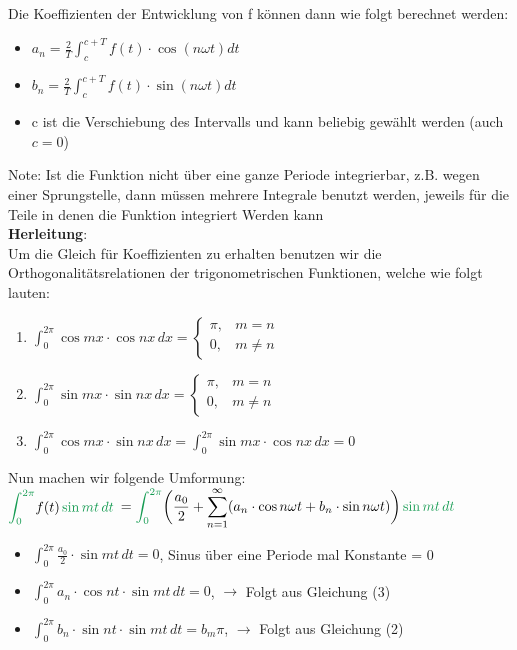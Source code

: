 \documentclass[12pt,a4paper]{article}
\newcommand{\green}[1]{\textcolor{ForestGreen} {#1}}
\newcommand{\nl}{\\[0.1cm]}
\begin{document}
Die Koeffizienten der Entwicklung von f können dann wie folgt berechnet werden:\nl
\begin{itemize}
\item $\displaystyle a_n = \frac{2}{T} \int_c^{c+T} f(t)\cdot \cos(n\omega t)dt$
\item $\displaystyle b_n = \frac{2}{T} \int_c^{c+T} f(t)\cdot \sin(n\omega t)dt$
\item c ist die Verschiebung des Intervalls und kann beliebig gewählt werden (auch $c=0$)
\end{itemize}
Note: Ist die Funktion nicht über eine ganze Periode integrierbar, z.B. wegen einer Sprungstelle, dann müssen mehrere Integrale benutzt werden, jeweils für die Teile in denen die Funktion integriert Werden kann\\
\textbf{Herleitung}:\nl
Um die Gleich für Koeffizienten zu erhalten benutzen wir die Orthogonalitätsrelationen der trigonometrischen Funktionen, welche wie folgt lauten:
\begin{enumerate}
\item $\displaystyle \int_0^{2\pi} \cos mx \cdot \cos nx \,dx = \begin{cases}\pi ,& m=n\\0 ,& m\neq n\end{cases}$
\item $\displaystyle \int_0^{2\pi} \sin mx \cdot \sin nx \,dx = \begin{cases}\pi ,& m=n\\0 ,& m\neq n\end{cases}$
\item $\displaystyle \int_0^{2\pi} \cos mx \cdot \sin nx \,dx = \int_0^{2\pi} \sin mx \cdot \cos nx \,dx = 0$
\end{enumerate}
Nun machen wir folgende Umformung:\nl
$\displaystyle \green{\int_0^{2\pi}} f(t)\, \green{\sin mt \, dt}$
$\displaystyle = \green{\int_0^{2\pi}} \bigg( \frac{a_0}{2} + \sum_{n=1}^\infty (a_n \cdot \cos n\omega t + b_n\cdot \sin n\omega t)\bigg)\, \green{\sin mt\, dt}$
\begin{itemize}
\item $\displaystyle \int_0^{2\pi} \frac{a_0}{2} \cdot \sin mt \, dt = 0$, \quad Sinus über eine Periode mal Konstante = 0
\item $\displaystyle \int_0^{2\pi} a_n \cdot \cos nt \cdot  \sin mt \, dt = 0$, \quad$\rightarrow$ Folgt aus Gleichung (3)
\item $\displaystyle \int_0^{2\pi} b_n \cdot \sin nt \cdot  \sin mt \, dt = b_m \pi$, \quad$\rightarrow$ Folgt aus Gleichung (2)\\
\end{itemize}
\end{document}
